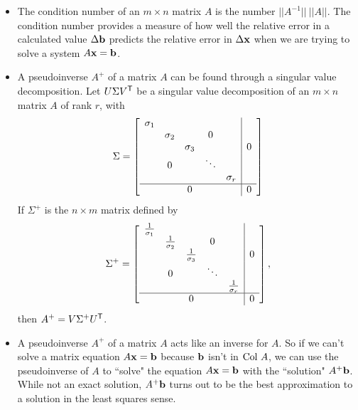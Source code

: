 \begin{itemize}
\item The condition number of an $m \times n$ matrix $A$ is the number $||A^{-1}|| \ ||A||$. The condition number provides a measure of how well the relative error in a calculated value $\Delta \mathbf{b}$ predicts the relative error in $\Delta \mathbf{x}$ when we are trying to solve a system $A \mathbf{x} = \mathbf{b}$.  
\item A pseudoinverse $A^{+}$ of a matrix $A$ can be found through a singular value decomposition. Let $U \Sigma V^{\mathsf{T}}$ be a singular value decomposition of an $m \times n$ matrix $A$ of rank $r$, with
\[\Sigma = \left[ \begin{array}{ccccc|c} \sigma_1&&&&& \\ & \sigma_2&&0&& \\ && \sigma_3&&&0 \\ & 0 & & \ddots & & \\ &&&& \sigma_r \\ \hline &&0&&&0 \end{array} \right] \]
If $\Sigma^+$ is the $n \times m$ matrix defined by
\[\Sigma^{+} = \left[ \begin{array}{ccccc|c} \frac{1}{\sigma_1}&&&&& \\ & \frac{1}{\sigma_2}&&0&& \\ && \frac{1}{\sigma_3}&&&0 \\ & 0 & & \ddots & & \\ &&&& \frac{1}{\sigma_r} \\ \hline &&0&&&0 \end{array} \right],\]
then $A^{+} = V\Sigma^{+}U^{\mathsf{T}}$. 
\item A pseudoinverse $A^{+}$ of a matrix $A$ acts like an inverse for $A$. So if we can't solve a matrix equation $A \mathbf{x} = \mathbf{b}$ because $\mathbf{b}$ isn't in $\text{Col } A$, we can use the pseudoinverse of $A$ to ``solve" the equation $A \mathbf{x} = \mathbf{b}$ with the ``solution" $A^+ \mathbf{b}$. While not an exact solution, $A^+ \mathbf{b}$ turns out to be the best approximation to a solution in the least squares sense. 
\end{itemize}


